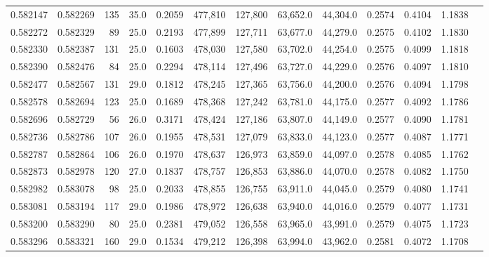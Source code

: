 \begin{tabular}{rrrrrrrrrrrrr}
0.582147 & 0.582269 &   135 & 35.0 &                                     0.2059 & 477,810 & 127,800 &  63,652.0 &  44,304.0 & 0.2574 & 0.4104 & 1.1838 \\
0.582272 & 0.582329 &    89 & 25.0 &                                     0.2193 & 477,899 & 127,711 &  63,677.0 &  44,279.0 & 0.2575 & 0.4102 & 1.1830 \\
0.582330 & 0.582387 &   131 & 25.0 &                                     0.1603 & 478,030 & 127,580 &  63,702.0 &  44,254.0 & 0.2575 & 0.4099 & 1.1818 \\
0.582390 & 0.582476 &    84 & 25.0 &                                     0.2294 & 478,114 & 127,496 &  63,727.0 &  44,229.0 & 0.2576 & 0.4097 & 1.1810 \\
0.582477 & 0.582567 &   131 & 29.0 &                                     0.1812 & 478,245 & 127,365 &  63,756.0 &  44,200.0 & 0.2576 & 0.4094 & 1.1798 \\
0.582578 & 0.582694 &   123 & 25.0 &                                     0.1689 & 478,368 & 127,242 &  63,781.0 &  44,175.0 & 0.2577 & 0.4092 & 1.1786 \\
0.582696 & 0.582729 &    56 & 26.0 &                                     0.3171 & 478,424 & 127,186 &  63,807.0 &  44,149.0 & 0.2577 & 0.4090 & 1.1781 \\
0.582736 & 0.582786 &   107 & 26.0 &                                     0.1955 & 478,531 & 127,079 &  63,833.0 &  44,123.0 & 0.2577 & 0.4087 & 1.1771 \\
0.582787 & 0.582864 &   106 & 26.0 &                                     0.1970 & 478,637 & 126,973 &  63,859.0 &  44,097.0 & 0.2578 & 0.4085 & 1.1762 \\
0.582873 & 0.582978 &   120 & 27.0 &                                     0.1837 & 478,757 & 126,853 &  63,886.0 &  44,070.0 & 0.2578 & 0.4082 & 1.1750 \\
0.582982 & 0.583078 &    98 & 25.0 &                                     0.2033 & 478,855 & 126,755 &  63,911.0 &  44,045.0 & 0.2579 & 0.4080 & 1.1741 \\
0.583081 & 0.583194 &   117 & 29.0 &                                     0.1986 & 478,972 & 126,638 &  63,940.0 &  44,016.0 & 0.2579 & 0.4077 & 1.1731 \\
0.583200 & 0.583290 &    80 & 25.0 &                                     0.2381 & 479,052 & 126,558 &  63,965.0 &  43,991.0 & 0.2579 & 0.4075 & 1.1723 \\
0.583296 & 0.583321 &   160 & 29.0 &                                     0.1534 & 479,212 & 126,398 &  63,994.0 &  43,962.0 & 0.2581 & 0.4072 & 1.1708 \\

\end{tabular}
